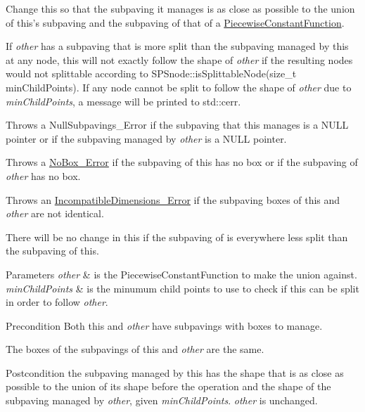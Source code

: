 \-Change this so that the subpaving it manages is as close as possible to the union of this's subpaving and the subpaving of that of a \hyperlink{classsubpavings_1_1PiecewiseConstantFunction}{\-Piecewise\-Constant\-Function}. 

\-If {\itshape other\/} has a subpaving that is more split than the subpaving managed by this at any node, this will not exactly follow the shape of {\itshape other\/} if the resulting nodes would not splittable according to \-S\-P\-Snode\-::is\-Splittable\-Node(size\-\_\-t min\-Child\-Points). \-If any node cannot be split to follow the shape of {\itshape other\/} due to {\itshape min\-Child\-Points\/}, a message will be printed to std\-::cerr.

\-Throws a \-Null\-Subpavings\-\_\-\-Error if the subpaving that this manages is a \-N\-U\-L\-L pointer or if the subpaving managed by {\itshape other\/} is a \-N\-U\-L\-L pointer.

\-Throws a \hyperlink{classsubpavings_1_1NoBox__Error}{\-No\-Box\-\_\-\-Error} if the subpaving of this has no box or if the subpaving of {\itshape other\/} has no box.

\-Throws an \hyperlink{classsubpavings_1_1IncompatibleDimensions__Error}{\-Incompatible\-Dimensions\-\_\-\-Error} if the subpaving boxes of this and {\itshape other\/} are not identical.

\-There will be no change in this if the subpaving of  is everywhere less split than the subpaving of this.


\begin{DoxyParams}{\-Parameters}
{\em other} & is the \-Piecewise\-Constant\-Function to make the union against. \\
\hline
{\em min\-Child\-Points} & is the minumum child points to use to check if this can be split in order to follow {\itshape other\/}. \\
\hline
\end{DoxyParams}
\begin{DoxyPrecond}{\-Precondition}
\-Both this and {\itshape other\/} have subpavings with boxes to manage. 

\-The boxes of the subpavings of this and {\itshape other\/} are the same. 
\end{DoxyPrecond}
\begin{DoxyPostcond}{\-Postcondition}
the subpaving managed by this has the shape that is as close as possible to the union of its shape before the operation and the shape of the subpaving managed by {\itshape other\/}, given {\itshape min\-Child\-Points\/}. {\itshape other\/} is unchanged. 
\end{DoxyPostcond}


